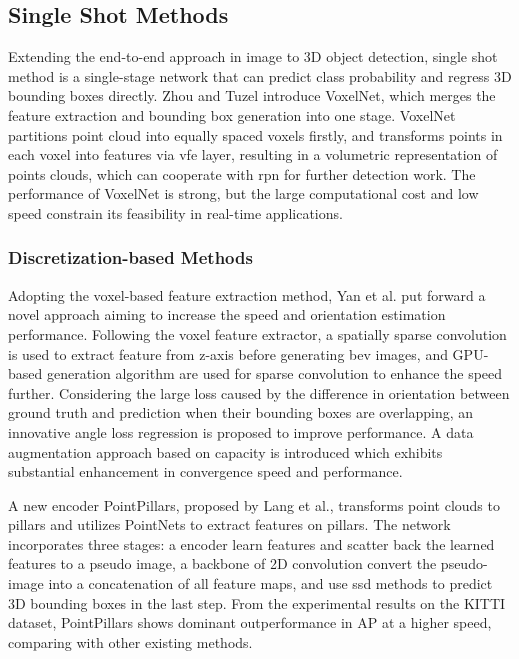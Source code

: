 \subsection{Single Shot Methods}
Extending the end-to-end approach in image to 3D object detection, single shot method is a single-stage network that can predict class probability and regress 3D bounding boxes directly. Zhou and Tuzel\cite{zhou_voxelnet_2017} introduce VoxelNet, which merges the feature extraction and bounding box generation into one stage. VoxelNet partitions point cloud into equally spaced voxels firstly, and transforms points in each voxel into features via \acrshort{vfe} layer, resulting in a volumetric representation of points clouds, which can cooperate with \acrshort{rpn} for further detection work. The performance of VoxelNet is strong, but the large computational cost and low speed constrain its feasibility in real-time applications. 
\subsubsection{Discretization-based Methods}
Adopting the voxel-based feature extraction method, Yan et al.\cite{graham_3d_2017} put forward a novel approach aiming to increase the speed and orientation estimation performance\cite{yan_second_2018}. Following the voxel feature extractor, a spatially sparse convolution is used to extract feature from z-axis before generating \acrshort{bev} images, and GPU-based generation algorithm are used for sparse convolution to enhance the speed further. Considering the large loss caused by the difference in orientation between ground truth and prediction when their bounding boxes are overlapping, an innovative angle loss regression is proposed to improve performance. A data augmentation approach based on capacity is introduced which exhibits substantial enhancement in convergence speed and performance.

A new encoder PointPillars, proposed by Lang et al.\cite{lang_pointpillars_2019}, transforms point clouds to pillars and utilizes PointNets to extract features on pillars. The network incorporates three stages: a encoder learn features and scatter back the learned features to a pseudo image, a backbone of 2D convolution convert the pseudo-image into a concatenation of all feature maps, and use \acrshort{ssd} methods to predict 3D bounding boxes in the last step. From the experimental results on the KITTI\cite{geiger_vision_2013} dataset, PointPillars shows dominant outperformance in AP at a higher speed, comparing with other existing methods.

